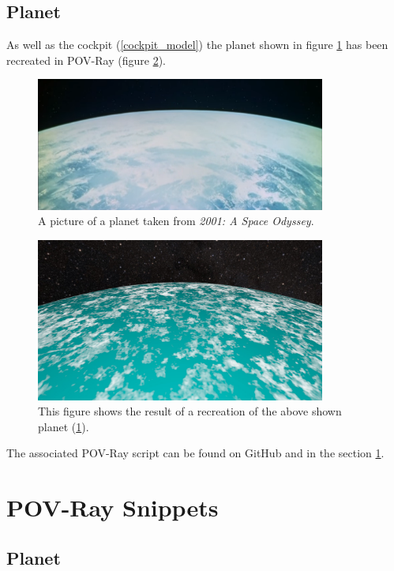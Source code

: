 \subsection{Planet}
As well as the cockpit (\ref{cockpit_model}) the planet shown in figure \ref{planet_original} has been recreated in POV-Ray (figure \ref{planet_povray}).
\begin{figure}[ht]
	\centering
	\includegraphics[width=0.85\textwidth]{images/original_planet.png}
	\caption{A picture of a planet taken from \textit{2001: A Space Odyssey}.}
	\label{planet_original}
\end{figure}

\begin{figure}[ht]
	\centering
	\includegraphics[width=0.85\textwidth]{images/scene04_05.jpg}
	\caption{This figure shows the result of a recreation of the above shown planet (\ref{planet_original}).}
	\label{planet_povray}
\end{figure}

The associated POV-Ray script can be found on GitHub \cite{Quving} and in the section \ref{povray_snippets}.

\newpage
\section{POV-Ray Snippets} \label{povray_snippets}

\subsection{Planet}

